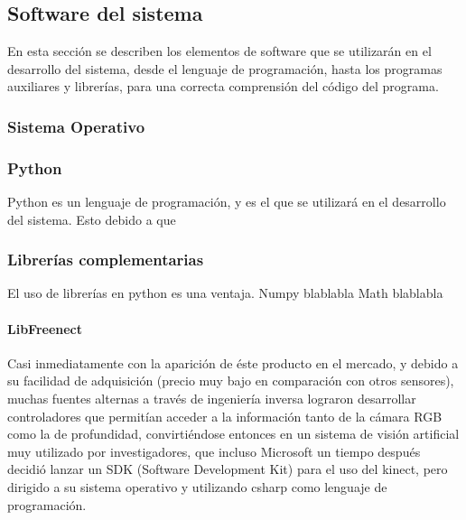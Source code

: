 \documentclass[a4paper,openright,12pt]{report}
\begin{document}
\subsection{Software del sistema}
En esta sección se describen los elementos de software que se utilizarán en el desarrollo del sistema, desde el lenguaje de programación, hasta los programas auxiliares y librerías, para una correcta comprensión del código del programa.
\subsubsection{Sistema Operativo}

\subsubsection{Python}
Python es un lenguaje de programación, y es el que se utilizará en el desarrollo del sistema. Esto debido a que 
\subsubsection{Librerías complementarias}
El uso de librerías en python es una ventaja.
Numpy blablabla
Math blablabla
\paragraph{LibFreenect}
Casi inmediatamente con la aparición de éste producto en el mercado, y debido a su facilidad de adquisición (precio muy bajo en comparación con otros sensores), muchas fuentes alternas a través de ingeniería inversa lograron desarrollar controladores que permitían acceder a la información tanto de la cámara RGB como la de profundidad, convirtiéndose entonces en un sistema de visión artificial muy utilizado por investigadores, que incluso Microsoft un tiempo después decidió lanzar un SDK (Software Development Kit) para el uso del kinect, pero dirigido a su sistema operativo y utilizando csharp como lenguaje de programación.\\
\end{document}
